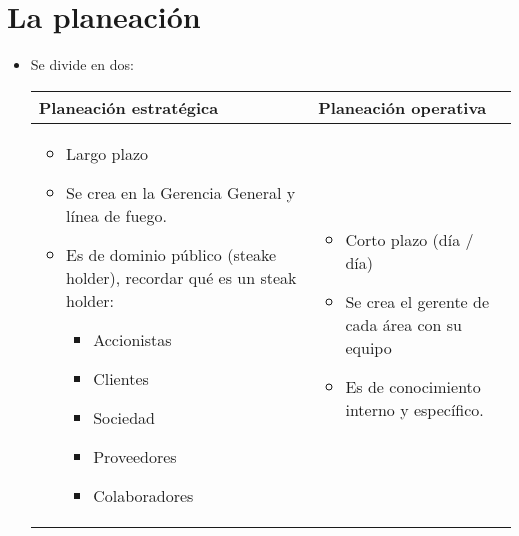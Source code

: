 \section{La planeación}
\begin{itemize}
    \item Se divide en dos:
        \begin{center}
           \begin{tabular}{ | p{7cm} | p{7cm}| }
               \hline
                   Planeación estratégica & Planeación operativa     \\
               \hline
                    \begin{itemize}
                        \item Largo plazo 
                        \item Se crea en la Gerencia General y línea de fuego.
                        \item Es de dominio público (steake holder), recordar qué es un steak holder:
                            \begin{itemize}[label=\#]
                                \item Accionistas 
                                \item Clientes 
                                \item Sociedad 
                                \item Proveedores 
                                \item Colaboradores
                            \end{itemize}
                    \end{itemize}
                    & 
                    \begin{itemize}
                        \item Corto plazo (día / día) 
                        \item Se crea el gerente de cada área con su equipo
                        \item Es de conocimiento interno y específico.
                    \end{itemize}
                    \\ 
                \hline
           \end{tabular}
        \end{center}
\end{itemize}


